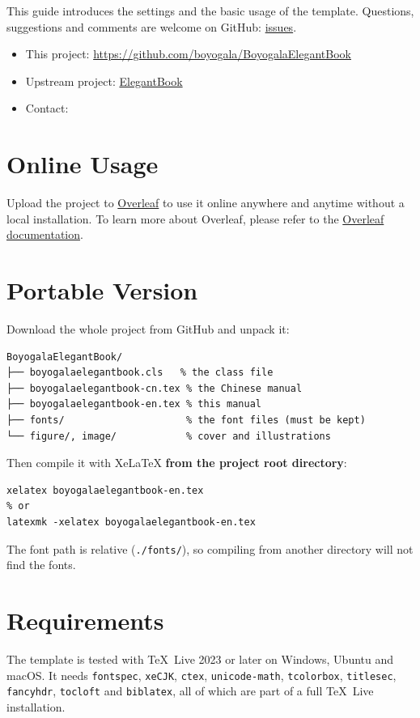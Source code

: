 \documentclass[11pt]{boyogalaelegantbook}
\begin{document}
This guide introduces the settings and the basic usage of the template.  Questions, suggestions and comments are welcome on GitHub: \href{https://github.com/boyogala/BoyogalaElegantBook/issues}{issues}.

\begin{itemize}
  \item This project: \href{https://github.com/boyogala/BoyogalaElegantBook}{https://github.com/boyogala/BoyogalaElegantBook}
  \item Upstream project: \href{https://github.com/ElegantLaTeX/ElegantBook}{ElegantBook}
  \item Contact: 
\end{itemize}

\section{Online Usage}
Upload the project to \href{https://www.overleaf.com/}{Overleaf} to use it online anywhere and anytime without a local installation.  To learn more about Overleaf, please refer to the \href{https://www.overleaf.com/learn}{Overleaf documentation}.


\section{Portable Version}
Download the whole project from GitHub and unpack it:

\begin{lstlisting}
BoyogalaElegantBook/
├── boyogalaelegantbook.cls   % the class file
├── boyogalaelegantbook-cn.tex % the Chinese manual
├── boyogalaelegantbook-en.tex % this manual
├── fonts/                     % the font files (must be kept)
└── figure/, image/            % cover and illustrations
\end{lstlisting}

Then compile it with XeLaTeX \textbf{from the project root directory}:

\begin{lstlisting}
xelatex boyogalaelegantbook-en.tex
% or
latexmk -xelatex boyogalaelegantbook-en.tex
\end{lstlisting}

The font path is relative (\lstinline{./fonts/}), so compiling from another directory will not find the fonts.


\section{Requirements}
The template is tested with \TeX~Live 2023 or later on Windows, Ubuntu and macOS.  It needs \lstinline{fontspec}, \lstinline{xeCJK}, \lstinline{ctex}, \lstinline{unicode-math}, \lstinline{tcolorbox}, \lstinline{titlesec}, \lstinline{fancyhdr}, \lstinline{tocloft} and \lstinline{biblatex}, all of which are part of a full \TeX~Live installation.
\end{document}
